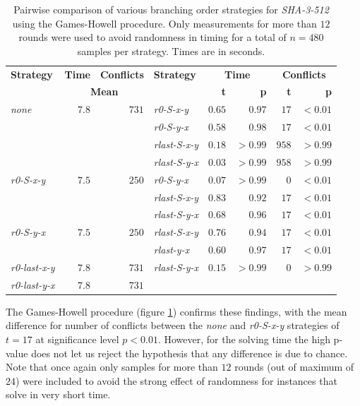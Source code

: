\begin{table}
\centering \begin{tabular}{lrrlrrrr}
\textbf{Strategy} & \textbf{Time} & \textbf{Conflicts} & \textbf{Strategy} & \multicolumn{2}{c}{\textbf{Time}} & \multicolumn{2}{c}{\textbf{Conflicts}} \\
& \multicolumn{2}{c}{\textbf{Mean}} & & \textbf{t} & \textbf{p} & \textbf{t} & \textbf{p} \\ \hline
\emph{none} & $7.8$ & $731$ & \emph{r0-S-x-y} & $0.65$ & $0.97$ & $17$ & $<0.01$ \\
& & & \emph{r0-S-y-x} & $0.58$ & $0.98$ & $17$ & $<0.01$ \\
& & & \emph{rlast-S-x-y} & $0.18$ & $>0.99$ & $958$ & $>0.99$ \\
& & & \emph{rlast-S-y-x} & $0.03$ & $>0.99$ & $958$ & $>0.99$ \\ \hline
\emph{r0-S-x-y} & $7.5$ & $250$ & \emph{r0-S-y-x} & $0.07$ & $>0.99$ & $0$ & $<0.01$ \\	
& & & \emph{rlast-S-x-y} & $0.83$ & $0.92$ & $17$ & $<0.01$ \\
& & & \emph{rlast-S-y-x} & $0.68$ & $0.96$ & $17$ & $<0.01$ \\ \hline
\emph{r0-S-y-x} & $7.5$ & $250$ & \emph{rlast-S-x-y} & $0.76$ & $0.94$ & $17$ & $<0.01$ \\
& & & \emph{rlast-y-x} & $0.60$ & $0.97$ & $17$ & $<0.01$ \\ \hline
\emph{r0-last-x-y} & $7.8$ & $731$ & \emph{rlast-S-y-x} & $0.15$ & $>0.99$ & $0$ & $>0.99$ \\ \hline
\emph{r0-last-y-x} & $7.8$ & $731$ & & & & &  \\
\end{tabular}
\caption{Pairwise comparison of various branching order strategies for \emph{SHA-3-512} using the Games-Howell procedure. Only measurements for more than $12$ rounds were used to avoid randomness in timing for a total of $n=480$ samples per strategy. Times are in seconds.}
\label{tbl:gh-sha3-bos}
\end{table}

The Games-Howell procedure (figure \ref{tbl:gh-sha3-bos}) confirms these findings, with the mean difference for number of conflicts between the \emph{none} and \emph{r0-S-x-y} strategies of $t = 17$ at significance level $p < 0.01$.
However, for the solving time the high p-value does not let us reject the hypothesis that any difference is due to chance.
Note that once again only samples for more than $12$ rounds (out of maximum of $24$) were included to avoid the strong effect of randomness for instances that solve in very short time.

